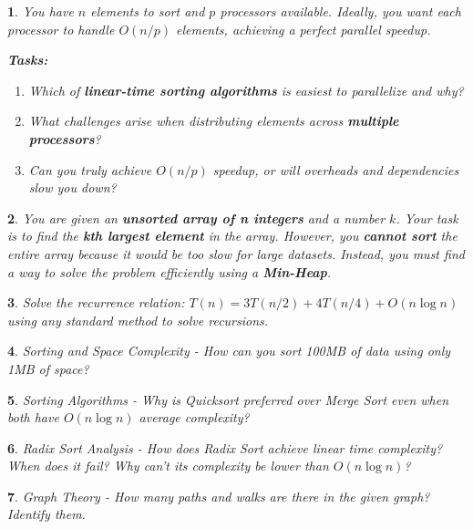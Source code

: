 \documentclass[%
addpoints]{exam}
\theoremstyle{problem}
\newtheorem{p}{}
\begin{document}
\begin{p}
You have \(n\) elements to sort and \(p\) processors available. Ideally, you want each processor to handle \(O(n/p)\) elements, achieving a perfect parallel speedup.

\textbf{Tasks:}
\begin{enumerate}
    \item Which of \textbf{linear-time sorting algorithms} is easiest to parallelize and why?
    \item What challenges arise when distributing elements across \textbf{multiple processors}?
    \item Can you truly achieve \(O(n/p)\) speedup, or will overheads and dependencies slow you down?
\end{enumerate}
\hfill\end{p}

\begin{p}
You are given an \textbf{unsorted array of n integers} and a number \(k\). Your task is to find the \textbf{kth largest element} in the array. However, you \textbf{cannot sort} the entire array because it would be too slow for large datasets. Instead, you must find a way to solve the problem efficiently using a \textbf{Min-Heap}.
\hfill\end{p}

\begin{p}
Solve the recurrence relation: \( T(n) = 3T(n/2) + 4T(n/4) + O(n \log n) \) using any standard method to solve recursions.
\hfill\end{p}

\begin{p}
Sorting and Space Complexity - How can you sort 100MB of data using only 1MB of space?
\hfill\end{p}

\begin{p}
Sorting Algorithms - Why is Quicksort preferred over Merge Sort even when both have \( O(n \log n) \) average complexity?
\hfill\end{p}

\begin{p}
Radix Sort Analysis - How does Radix Sort achieve linear time complexity? When does it fail? Why can't its complexity be lower than \( O(n \log n) \)?
\hfill\end{p}

\begin{p}
Graph Theory - How many paths and walks are there in the given graph? Identify them.
\begin{center}
\end{center}
\hfill\end{p}
\end{document}
